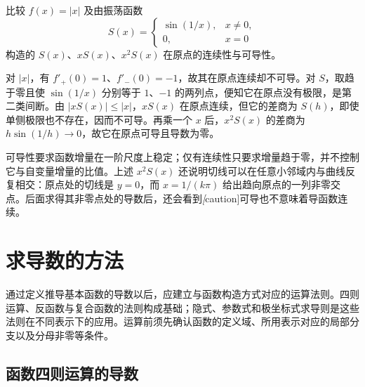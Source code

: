 \documentclass[UTF8,12pt,a4paper,fontset=fandol]{ctexbook}
\begin{document}
\begin{example}
\label{ex:absolute-value-and-oscillatory-differentiability}
比较 $f(x)=|x|$ 及由振荡函数
\[
    S(x)=\begin{cases}\sin(1/x),&x\ne0,\\0,&x=0\end{cases}
\]
构造的 $S(x)$、$xS(x)$、$x^2S(x)$ 在原点的连续性与可导性。
\end{example}
\begin{solve}
对 $|x|$，有 $f'_+(0)=1$、$f'_-(0)=-1$，故其在原点连续却不可导。对 $S$，取趋于零且使 $\sin(1/x)$ 分别等于 $1$、$-1$ 的两列点，便知它在原点没有极限，是第二类间断。由 $|xS(x)|\leq|x|$，$xS(x)$ 在原点连续，但它的差商为 $S(h)$，即使单侧极限也不存在，因而不可导。再乘一个 $x$ 后，$x^2S(x)$ 的差商为 $h\sin(1/h)\to0$，故它在原点可导且导数为零。
\end{solve}

可导性要求函数增量在一阶尺度上稳定；仅有连续性只要求增量趋于零，并不控制它与自变量增量的比值。上述 $x^2S(x)$ 还说明切线可以在任意小邻域内与曲线反复相交：原点处的切线是 $y=0$，而 $x=1/(k\pi)$ 给出趋向原点的一列非零交点。后面求得其非零点处的导数后，还会看到\emph[caution]{可导也不意味着导函数连续}。

\section{求导数的方法}
\label{sec:differentiation-methods}

通过定义推导基本函数的导数以后，应建立与函数构造方式对应的运算法则。四则运算、反函数与复合函数的法则构成基础；隐式、参数式和极坐标式求导则是这些法则在不同表示下的应用。运算前须先确认函数的定义域、所用表示对应的局部分支以及分母非零等条件。

\subsection{函数四则运算的导数}
\label{subsec:arithmetic-differentiation-rules}
\end{document}
